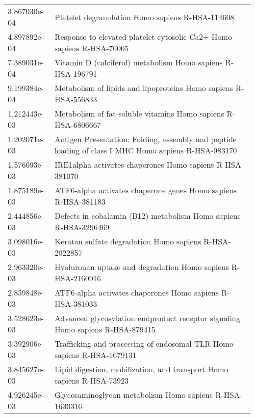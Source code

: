 \begin{longtable}{p{2.4cm}p{14.5cm}}
             3.867030e-04 &                                                      Platelet degranulation Homo sapiens R-HSA-114608 \\
             4.897892e-04 &                                 Response to elevated platelet cytosolic Ca2+ Homo sapiens R-HSA-76005 \\
             7.389031e-04 &                                           Vitamin D (calciferol) metabolism Homo sapiens R-HSA-196791 \\
             9.199384e-04 &                                       Metabolism of lipids and lipoproteins Homo sapiens R-HSA-556833 \\
             1.212443e-03 &                                         Metabolism of fat-soluble vitamins Homo sapiens R-HSA-6806667 \\
             1.202071e-03 &  Antigen Presentation: Folding, assembly and peptide loading of class I MHC Homo sapiens R-HSA-983170 \\
             1.576093e-03 &                                              IRE1alpha activates chaperones Homo sapiens R-HSA-381070 \\
             1.875189e-03 &                                        ATF6-alpha activates chaperone genes Homo sapiens R-HSA-381183 \\
             2.444856e-03 &                                      Defects in cobalamin (B12) metabolism Homo sapiens R-HSA-3296469 \\
             3.098016e-03 &                                                Keratan sulfate degradation Homo sapiens R-HSA-2022857 \\
             2.963320e-03 &                                          Hyaluronan uptake and degradation Homo sapiens R-HSA-2160916 \\
             2.839848e-03 &                                             ATF6-alpha activates chaperones Homo sapiens R-HSA-381033 \\
             3.528623e-03 &                        Advanced glycosylation endproduct receptor signaling Homo sapiens R-HSA-879415 \\
             3.392906e-03 &                                Trafficking and processing of endosomal TLR Homo sapiens R-HSA-1679131 \\
             3.845627e-03 &                                 Lipid digestion, mobilization, and transport Homo sapiens R-HSA-73923 \\
             4.926245e-03 &                                               Glycosaminoglycan metabolism Homo sapiens R-HSA-1630316 \\

\end{longtable}
